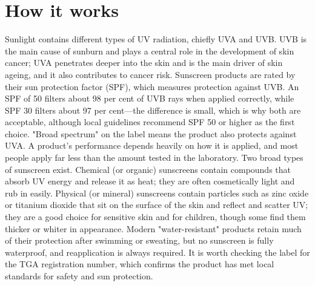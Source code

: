 \section*{How it works}
Sunlight contains different types of UV radiation, chiefly UVA and UVB. UVB is the main cause of sunburn and plays a central role in the development of skin cancer; UVA penetrates deeper into the skin and is the main driver of skin ageing, and it also contributes to cancer risk. Sunscreen products are rated by their sun protection factor (SPF), which measures protection against UVB. An SPF of 50 filters about 98 per cent of UVB rays when applied correctly, while SPF 30 filters about 97 per cent---the difference is small, which is why both are acceptable, although local guidelines recommend SPF 50 or higher as the first choice. "Broad spectrum" on the label means the product also protects against UVA. A product's performance depends heavily on how it is applied, and most people apply far less than the amount tested in the laboratory. Two broad types of sunscreen exist. Chemical (or organic) sunscreens contain compounds that absorb UV energy and release it as heat; they are often cosmetically light and rub in easily. Physical (or mineral) sunscreens contain particles such as zinc oxide or titanium dioxide that sit on the surface of the skin and reflect and scatter UV; they are a good choice for sensitive skin and for children, though some find them thicker or whiter in appearance. Modern "water-resistant" products retain much of their protection after swimming or sweating, but no sunscreen is fully waterproof, and reapplication is always required. It is worth checking the label for the TGA registration number, which confirms the product has met local standards for safety and sun protection.

